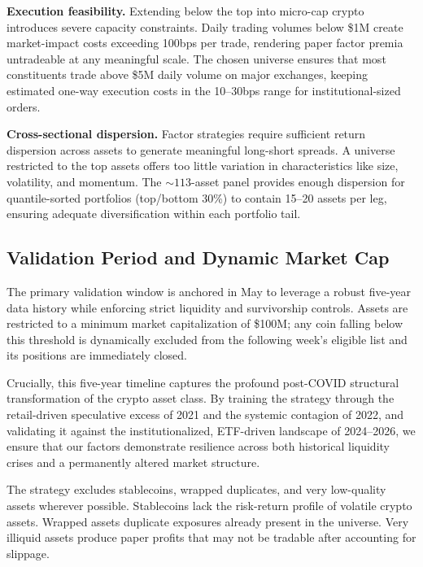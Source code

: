 \documentclass[11pt,a4paper]{article}
\begin{document}
\textbf{Execution feasibility.}\;
Extending below the top into micro-cap crypto introduces severe capacity constraints. Daily trading volumes below \$1\;M create market-impact costs exceeding 100\;bps per trade, rendering paper factor premia untradeable at any meaningful scale. The chosen universe ensures that most constituents trade above \$5\;M daily volume on major exchanges, keeping estimated one-way execution costs in the 10--30\;bps range for institutional-sized orders.

\textbf{Cross-sectional dispersion.}\;
Factor strategies require sufficient return dispersion across assets to generate meaningful long-short spreads. A universe restricted to the top assets offers too little variation in characteristics like size, volatility, and momentum. The ${\sim}113$-asset panel provides enough dispersion for quantile-sorted portfolios (top/bottom 30\%) to contain 15--20 assets per leg, ensuring adequate diversification within each portfolio tail.

\subsection{Validation Period and Dynamic Market Cap}

The primary validation window is anchored in May to leverage a robust five-year data history while enforcing strict liquidity and survivorship controls. Assets are restricted to a minimum market capitalization of \$100\;M; any coin falling below this threshold is dynamically excluded from the following week's eligible list and its positions are immediately closed.

Crucially, this five-year timeline captures the profound post-COVID structural transformation of the crypto asset class. By training the strategy through the retail-driven speculative excess of 2021 and the systemic contagion of 2022, and validating it against the institutionalized, ETF-driven landscape of 2024--2026, we ensure that our factors demonstrate resilience across both historical liquidity crises and a permanently altered market structure.

The strategy excludes stablecoins, wrapped duplicates, and very low-quality assets wherever possible. Stablecoins lack the risk-return profile of volatile crypto assets. Wrapped assets duplicate exposures already present in the universe. Very illiquid assets produce paper profits that may not be tradable after accounting for slippage.

\end{document}
